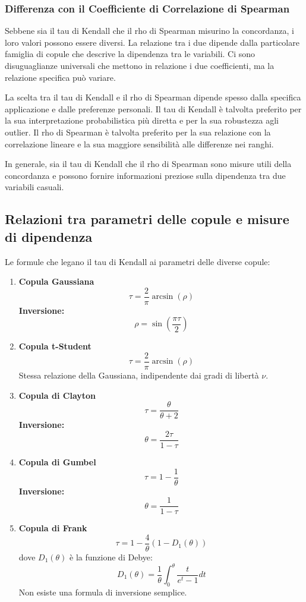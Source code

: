 \documentclass[%
	corpo=11pt,
    twoside,
    stile=classica,
    oldstyle,
    tipotesi=custom,
    greek,
    evenboxes,
]{toptesi}
\begin{document}
\subsubsection{Differenza con il Coefficiente di Correlazione di Spearman}

Sebbene sia il tau di Kendall che il rho di Spearman misurino la concordanza, i loro valori possono essere diversi. La relazione tra i due dipende dalla particolare famiglia di copule che descrive la dipendenza tra le variabili. Ci sono disuguaglianze universali che mettono in relazione i due coefficienti, ma la relazione specifica può variare.

La scelta tra il tau di Kendall e il rho di Spearman dipende spesso dalla specifica applicazione e dalle preferenze personali. Il tau di Kendall è talvolta preferito per la sua interpretazione probabilistica più diretta e per la sua robustezza agli outlier. Il rho di Spearman è talvolta preferito per la sua relazione con la correlazione lineare e la sua maggiore sensibilità alle differenze nei ranghi.

In generale, sia il tau di Kendall che il rho di Spearman sono misure utili della concordanza e possono fornire informazioni preziose sulla dipendenza tra due variabili casuali.

\subsection{Relazioni tra parametri delle copule e misure di dipendenza}

Le formule che legano il tau di Kendall ai parametri delle diverse copule:\\

\begin{enumerate}
	\item \textbf{Copula Gaussiana}
	\[
	\tau = \frac{2}{\pi} \arcsin(\rho)
	\]
	\textbf{Inversione:}
	\[
	\rho = \sin\left(\frac{\pi \tau}{2}\right)
	\]
	\item \textbf{Copula t-Student}
	\[
	\tau = \frac{2}{\pi} \arcsin(\rho)
	\]
	Stessa relazione della Gaussiana, indipendente dai gradi di libertà \( \nu \).
	\item \textbf{Copula di Clayton}
	\[
	\tau = \frac{\theta}{\theta + 2}
	\]
	\textbf{Inversione:}
	\[
	\theta = \frac{2\tau}{1 - \tau}
	\]
	\item \textbf{Copula di Gumbel}
	\[
	\tau = 1 - \frac{1}{\theta}
	\]
	\textbf{Inversione:}
	\[
	\theta = \frac{1}{1 - \tau}
	\]
	\item \textbf{Copula di Frank}
	\[
	\tau = 1 - \frac{4}{\theta} \left( 1 - D_1(\theta) \right)
	\]
	dove \( D_1(\theta) \) è la funzione di Debye:
	\[
	D_1(\theta) = \frac{1}{\theta} \int_0^{\theta} \frac{t}{e^t - 1} dt
	\]
	Non esiste una formula di inversione semplice.
\end{enumerate}
\end{document}
